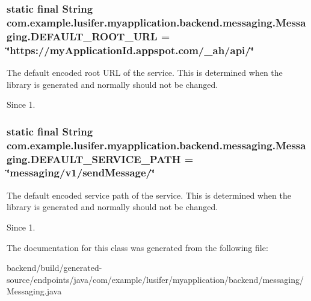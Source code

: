\subsubsection[{D\+E\+F\+A\+U\+L\+T\+\_\+\+R\+O\+O\+T\+\_\+\+U\+R\+L}]{\setlength{\rightskip}{0pt plus 5cm}static final String com.\+example.\+lusifer.\+myapplication.\+backend.\+messaging.\+Messaging.\+D\+E\+F\+A\+U\+L\+T\+\_\+\+R\+O\+O\+T\+\_\+\+U\+R\+L = \char`\"{}https\+://my\+Application\+Id.\+appspot.\+com/\+\_\+ah/api/\char`\"{}\hspace{0.3cm}{\ttfamily [static]}}\label{classcom_1_1example_1_1lusifer_1_1myapplication_1_1backend_1_1messaging_1_1_messaging_a44833e9f16f61e31fdaa199b9c02a18b}
The default encoded root U\+R\+L of the service. This is determined when the library is generated and normally should not be changed.

\begin{DoxySince}{Since}
1. 
\end{DoxySince}
\hypertarget{classcom_1_1example_1_1lusifer_1_1myapplication_1_1backend_1_1messaging_1_1_messaging_a7c1701efa3409a98f8c00f45dbd7253b}{}
\subsubsection[{D\+E\+F\+A\+U\+L\+T\+\_\+\+S\+E\+R\+V\+I\+C\+E\+\_\+\+P\+A\+T\+H}]{\setlength{\rightskip}{0pt plus 5cm}static final String com.\+example.\+lusifer.\+myapplication.\+backend.\+messaging.\+Messaging.\+D\+E\+F\+A\+U\+L\+T\+\_\+\+S\+E\+R\+V\+I\+C\+E\+\_\+\+P\+A\+T\+H = \char`\"{}messaging/v1/send\+Message/\char`\"{}\hspace{0.3cm}{\ttfamily [static]}}\label{classcom_1_1example_1_1lusifer_1_1myapplication_1_1backend_1_1messaging_1_1_messaging_a7c1701efa3409a98f8c00f45dbd7253b}
The default encoded service path of the service. This is determined when the library is generated and normally should not be changed.

\begin{DoxySince}{Since}
1. 
\end{DoxySince}


The documentation for this class was generated from the following file\+:\begin{DoxyCompactItemize}
\item 
backend/build/generated-\/source/endpoints/java/com/example/lusifer/myapplication/backend/messaging/Messaging.\+java\end{DoxyCompactItemize}
